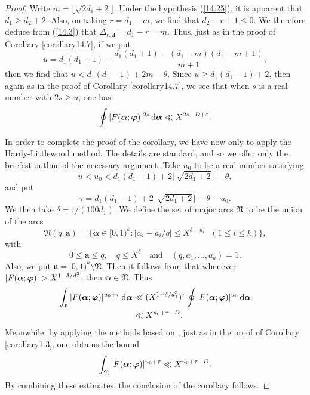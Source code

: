 \documentclass[12pt,reqno]{amsart}
\theoremstyle{definition}
\theoremstyle{remark}
\numberwithin{equation}{section}
\def\bfa{{\mathbf a}}
\def\bfd{{\mathbf d}} \def\bfe{{\mathbf e}} \def\bff{{\mathbf f}}
\def\grN{{\mathfrak N}}\def\grn{{\mathfrak n}}
\def\alp{{\alpha}} \def\bfalp{{\boldsymbol \alpha}}
\def\del{{\delta}} \def\Del{{\Delta}} \def\Deltil{{\widetilde \Delta}}
\def\tet{{\theta}} \def\bftet{{\boldsymbol \theta}}
\def\eps{\varepsilon}
\def\le{\leqslant} \def\ge{\geqslant} \def\pleq{\preccurlyeq} \def\ple{\prec}
\def\d{{\,{\rm d}}}
\begin{document}
\begin{proof} Write $m=\lfloor \sqrt{2d_1+2}\rfloor$. Under the hypothesis (\ref{14.25}), 
it is apparent that $d_1\ge d_2+2$. Also, on taking $r=d_1-m$, we find that 
$d_2-r+1\le 0$. We therefore deduce from (\ref{14.3}) that $\Del_{r,\bfd}=d_1-r=m$. 
Thus, just as in the proof of Corollary \ref{corollary14.7}, if we put
$$u=d_1(d_1+1)-\frac{d_1(d_1+1)-(d_1-m)(d_1-m+1)}{m+1},$$
then we find that $u<d_1(d_1-1)+2m-\tet$. Since $u\ge d_1(d_1-1)+2$, then again as in 
the proof of Corollary \ref{corollary14.7}, we see that when $s$ is a real number with 
$2s\ge u$, one has
$$\oint |F(\bfalp;\bfvarphi)|^{2s}\d\bfalp \ll X^{2s-D+\eps}.$$

\par In order to complete the proof of the corollary, we have now only to apply the 
Hardy-Littlewood method. The details are standard, and so we offer only the briefest outline 
of the necessary argument. Take $u_0$ to be a real number satisfying
$$u<u_0<d_1(d_1-1)+2\lfloor \sqrt{2d_1+2}\rfloor-\tet,$$
and put
$$\tau=d_1(d_1-1)+2\lfloor \sqrt{2d_1+2}\rfloor -\tet-u_0.$$
We then take $\del=\tau/(100d_1)$. We define the set of major arcs $\grN$ to be the 
union of the arcs
$$\grN(q,\bfa)=\{ \bfalp \in [0,1)^k:\text{$|\alp_i-a_i/q|\le X^{\del-d_i}$ $(1\le i\le k)$}\},
$$
with
$$0\le \bfa\le q,\quad q\le X^\del\quad \text{and}\quad (q,a_1,\ldots ,a_k)=1.$$
Also, we put 
$\grn=[0,1)^k\setminus \grN$. Then it follows from \cite[Theorem 1.6]{Woo2012} that 
whenever $|F(\bfalp;\bfvarphi)|>X^{1-\del/d_1^3}$, then $\bfalp \in \grN$. Thus
\begin{align*}
\int_\grn |F(\bfalp;\bfvarphi)|^{u_0+\tau}\d\bfalp &\ll (X^{1-\del /d_1^3})^\tau 
\oint |F(\bfalp;\bfvarphi)|^{u_0}\d\bfalp \\
&\ll X^{u_0+\tau-D}.
\end{align*}
Meanwhile, by applying the methods based on \cite[Theorems 1.3 and 2.4]{ACK2004}, just 
as in the proof of Corollary \ref{corollary1.3}, one obtains the bound
$$\int_\grN |F(\bfalp;\bfvarphi)|^{u_0+\tau}\ll X^{u_0+\tau-D}.$$
By combining these estimates, the conclusion of the corollary follows.
\end{proof}
\end{document}
